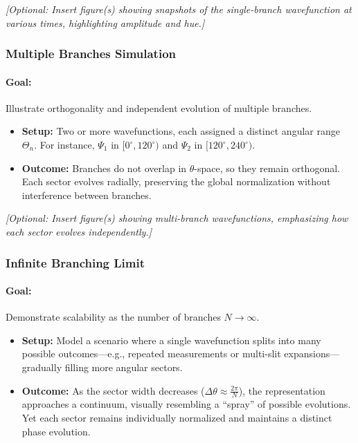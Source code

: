 \noindent
\textit{[Optional: Insert figure(s) showing snapshots of the single-branch wavefunction at various times, highlighting amplitude and hue.]}


\subsubsection{Multiple Branches Simulation}
\paragraph{Goal:} Illustrate orthogonality and independent evolution of multiple branches.
\begin{itemize}
    \item \textbf{Setup:} Two or more wavefunctions, each assigned a distinct angular range \(\Theta_n\). For instance, \(\Psi_1\) in \([0^\circ,120^\circ)\) and \(\Psi_2\) in \([120^\circ,240^\circ)\).
    \item \textbf{Outcome:} Branches do not overlap in \(\theta\)-space, so they remain orthogonal. Each sector evolves radially, preserving the global normalization without interference between branches.
\end{itemize}

\noindent
\textit{[Optional: Insert figure(s) showing multi-branch wavefunctions, emphasizing how each sector evolves independently.]}



\subsubsection{Infinite Branching Limit}
\paragraph{Goal:} Demonstrate scalability as the number of branches \(N\to\infty\).
\begin{itemize}
    \item \textbf{Setup:} Model a scenario where a single wavefunction splits into many possible outcomes—e.g., repeated measurements or multi-slit expansions—gradually filling more angular sectors.
    \item \textbf{Outcome:} As the sector width decreases (\(\Delta\theta \approx \tfrac{2\pi}{N}\)), the representation approaches a continuum, visually resembling a “spray” of possible evolutions. Yet each sector remains individually normalized and maintains a distinct phase evolution.
\end{itemize}


